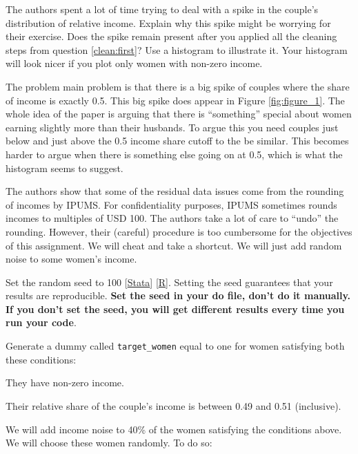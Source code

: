 \documentclass[a4paper, 11pt,addpoints,answers]{exam}
\begin{document}
\begin{questions}
	\question[15] The authors spent a lot of time trying to deal with a spike in the couple's distribution of relative income. Explain why this spike might be worrying for their exercise. Does the spike remain present after you applied all the cleaning steps from question \ref{clean:first}? Use a histogram to illustrate it. Your histogram will look nicer if you plot only women with non-zero income.
	\begin{solution}
	The problem main problem is that there is a big spike of couples where the share of income is exactly 0.5.  This big spike does appear in Figure \ref{fig:figure_1}. The whole idea of the paper is arguing that there is ``something'' special about women earning slightly more than their husbands. To argue this you need couples just below and just above the 0.5 income share cutoff to the be similar. This becomes harder to argue when there is something else going on at 0.5, which is what the histogram seems to suggest. 
	
	\end{solution}
	\FloatBarrier
	\question[15] The authors show that some of the residual data issues come from the rounding of incomes by IPUMS. For confidentiality purposes, IPUMS sometimes rounds incomes to multiples of USD 100. The authors take a lot of care to ``undo'' the rounding. However, their (careful) procedure is too cumbersome for the objectives of this assignment. We will cheat and take a shortcut. We will just add random noise to some women's income.
	\label{question:noise}
	\benu[label=(\alph*)]
		\item Set the random seed to 100 [\href{https://stats.oarc.ucla.edu/stata/faq/how-can-i-draw-a-random-sample-of-my-data/#:~:text=Setting%20the%20seed&text=The%20seed%20is%20the%20number,command%20followed%20by%20a%20number}{Stata}] [\href{https://r-coder.com/set-seed-r/}{R}]. Setting the seed guarantees that your results are reproducible. \textbf{Set the seed in your do file, don't do it manually. If you don't set the seed, you will get different results every time you run your code}.
		\item Generate a dummy called {\tt target\_women} equal to one for women satisfying both these conditions:
		\bitem 
			\item They have non-zero income.
			\item Their relative share of the couple's income is between 0.49 and 0.51 (inclusive).
 		\eitem   
 		\item We will add  income noise to 40\% of the women satisfying the conditions above. We will choose these women randomly. To do so:

\end{questions}
\end{document}
